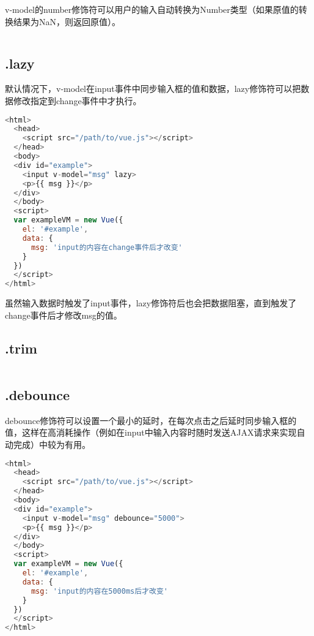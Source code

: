 v-model的number修饰符可以用户的输入自动转换为Number类型（如果原值的转换结果为NaN，则返回原值）。

\begin{lstlisting}[language=JavaScript]

\end{lstlisting}


\subsection{.lazy}

默认情况下，v-model在input事件中同步输入框的值和数据，lazy修饰符可以把数据修改指定到change事件中才执行。

\begin{lstlisting}[language=JavaScript]
<html>
  <head>
    <script src="/path/to/vue.js"></script>
  </head>
  <body>
  <div id="example">
    <input v-model="msg" lazy>
    <p>{{ msg }}</p>
  </div>
  </body>
  <script>
  var exampleVM = new Vue({
    el: '#example',
    data: {
      msg: 'input的内容在change事件后才改变'
    }
  })
  </script>
</html>
\end{lstlisting}

虽然输入数据时触发了input事件，lazy修饰符后也会把数据阻塞，直到触发了change事件后才修改msg的值。

\subsection{.trim}


\begin{lstlisting}[language=JavaScript]

\end{lstlisting}


\subsection{.debounce}

debounce修饰符可以设置一个最小的延时，在每次点击之后延时同步输入框的值，这样在高消耗操作（例如在input中输入内容时随时发送AJAX请求来实现自动完成）中较为有用。



\begin{lstlisting}[language=JavaScript]
<html>
  <head>
    <script src="/path/to/vue.js"></script>
  </head>
  <body>
  <div id="example">
    <input v-model="msg" debounce="5000">
    <p>{{ msg }}</p>
  </div>
  </body>
  <script>
  var exampleVM = new Vue({
    el: '#example',
    data: {
      msg: 'input的内容在5000ms后才改变'
    }
  })
  </script>
</html>
\end{lstlisting}




